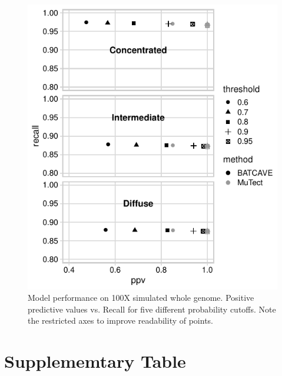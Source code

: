 \documentclass[a4,center,fleqn]{NAR}
\begin{document}
\clearpage
\begin{figure}
  \begin{center}
  \includegraphics{figures/ppv_wgs.pdf}
  \end{center}
  \caption{Model performance on 100X simulated whole genome. 
  Positive predictive values vs. Recall for five different probability cutoffs. 
  Note the restricted axes to improve readability of points.}
\label{NAR-ppv_wgs_fig}
\end{figure}

\section{Supplememtary Table}
\end{document}
